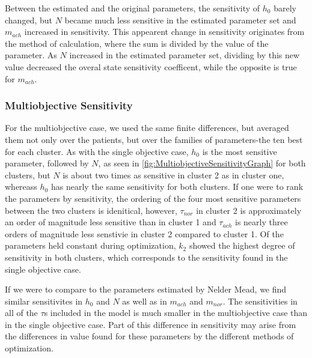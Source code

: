 \documentclass[fleqn,10pt]{wlscirep}
\begin{document}
Between the estimated and the original parameters, the sensitivity of $h_0$ barely changed, but $N$ became much less sensitive in the estimated parameter set and $m_{ach}$ increased in sensitivity. This appearent change in sensitivity originates from the method of calculation, where the sum is divided by the value of the parameter. As $N$ increased in the estimated parameter set, dividing by this new value decreased the overal state sensitivity coefficent, while the opposite is true for $m_{ach}$.
\subsubsection*{Multiobjective Sensitivity} 
For the multiobjective case, we used the same finite differences, but averaged them not only over the patients, but over the families of parameters-the ten best for each cluster. As with the single objective case, $h_0$ is the most sensitive parameter, followed by $N$, as seen in \ref{fig:MultiobjectiveSensitivityGraph} for both clusters, but $N$ is about two times as sensitive in cluster 2 as in cluster one, whereass $h_0$ has nearly the same sensitivity for both clusters. If one were to rank the parameters by sensitivity, the ordering of the four most sensitive parameters between the two clusters is idenitical, however, $\tau_{nor}$ in cluster 2 is approximately an order of magnitude less sensitive than in cluster 1 and $\tau_{ach}$ is nearly three orders of magnitude less senstivie in cluster 2 compared to cluster 1. Of the parameters held constant during optimization, $k_2$ showed the highest degree of sensitivity in both clusters, which corresponds to the sensitivity found in the single objective case.

If we were to compare to the parameters estimated by Nelder Mead, we find similar sensitivites in $h_0$ and $N$ as well as in $m_{ach}$ and $m_{nor}$. The sensitivities in all of the $\tau$s included in the model is much smaller in the multiobjective case than in the single objective case. Part of this difference in sensitivity may arise from the differences in value found for these parameters by the different methods of optimization.
\end{document}
